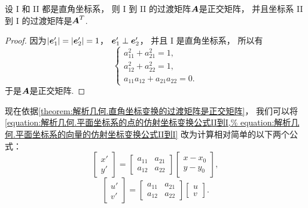 \begin{theorem}\label{theorem:解析几何.直角坐标变换的过渡矩阵是正交矩阵}
设 I 和 II 都是直角坐标系，
则 I 到 II 的过渡矩阵\(\boldsymbol{A}\)是正交矩阵，
并且坐标系 II 到 I 的过渡矩阵是\(\boldsymbol{A}^T\).
\begin{proof}
因为\(\abs{\boldsymbol{e}_1'}=\abs{\boldsymbol{e}_2'}=1\)，
\(\boldsymbol{e}_1' \perp \boldsymbol{e}_2'\)，
并且 I 是直角坐标系，
所以有\begin{equation}\label{equation:解析几何.直角坐标变换的过渡矩阵的限定条件}
	\left\{ \begin{array}{l}
		a_{11}^2 + a_{21}^2 = 1, \\
		a_{12}^2 + a_{22}^2 = 1, \\
		a_{11} a_{12} + a_{21} a_{22} = 0.
	\end{array} \right.
\end{equation}
于是\(\boldsymbol{A}\)是正交矩阵.
\end{proof}
\end{theorem}

现在依据\cref{theorem:解析几何.直角坐标变换的过渡矩阵是正交矩阵}，
我们可以将\cref{equation:解析几何.平面坐标系的点的仿射坐标变换公式II到I,%
equation:解析几何.平面坐标系的向量的仿射坐标变换公式II到I} 改为计算相对简单的以下两个公式：
\begin{equation}\label{equation:解析几何.平面坐标系的点的直角坐标变换公式II到I.矩阵形式1}
	\begin{bmatrix}
		x' \\ y'
	\end{bmatrix}
	= \begin{bmatrix}
		a_{11} & a_{21} \\
		a_{12} & a_{22}
	\end{bmatrix} \begin{bmatrix}
		x - x_0 \\ y - y_0
	\end{bmatrix},
\end{equation}
\begin{equation}\label{equation:解析几何.平面坐标系的向量的直角坐标变换公式II到I.矩阵形式1}
	\begin{bmatrix}
		u' \\ v'
	\end{bmatrix}
	= \begin{bmatrix}
		a_{11} & a_{21} \\
		a_{12} & a_{22}
	\end{bmatrix} \begin{bmatrix}
		u \\ v
	\end{bmatrix}.
\end{equation}

